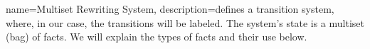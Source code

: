 {
    name={Multiset Rewriting System},
    description={defines a transition system, where, in our case, the transitions will be labeled. The system's state is a multiset (bag) of facts. We will explain the types of facts and their use below.}
}

